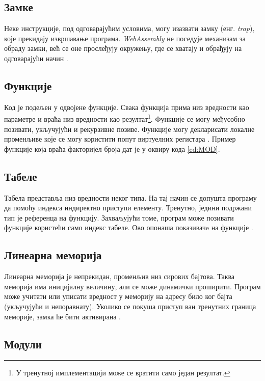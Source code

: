 \documentclass[12pt,oneside]{memoir}
\begin{document}
\subsection{Замке}

Неке инструкције, под одговарајућим условима, могу изазвати замку (енг. \textit{trap}), које прекидају извршавање
програма. \textit{WebAssembly} не поседује механизам за обраду замки, већ се оне прослеђују окружењу, где се хватају
и обрађују на одговарајући начин \cite{WASMS}.

\subsection{Функције}

Код је подељен у одвојене функције. Свака функција прима низ вредности као параметре и враћа низ вредности као
резултат\footnote{У тренутној имплементацији може се вратити само један резултат.}. Функције се могу међусобно
позивати, укључујући и рекурзивне позиве. Функције могу декларисати локалне променљиве које се могу користити попут
виртуелних регистара \cite{WASMS}. Пример функције која враћа факторијел броја дат је у оквиру кода \ref{cd:MOD}.


\subsection{Табеле}

Табела представља низ вредности неког типа. На тај начин се допушта програму да помоћу индекса индиректно приступи
елементу. Тренутно, једини подржани тип је референца на функцију. Захваљујући томе, програм може позивати функције
користећи само индекс табеле. Ово опонаша показивачe на функције \cite{WASMS}.

\subsection{Линеарна меморија}

Линеарна меморија је непрекидан, променљив низ сирових бајтова. Таква меморија има иницијалну величину, али се може
динамички проширити. Програм може учитати или уписати вредност у меморију на адресу било ког бајта (укључујући и
непоравнату). Уколико се покуша приступ ван тренутних граница меморије, замка ће бити активирана \cite{WASMS}.

\subsection{Модули}
\end{document}

